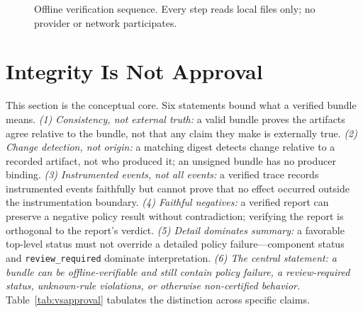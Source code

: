 \documentclass[conference]{IEEEtran}
\newcommand{\code}[1]{\texttt{\small #1}}
\begin{document}
\begin{figure}[t]
\centering
{}
\caption{Offline verification sequence. Every step reads local files only; no provider
or network participates.}
\label{fig:seq}
\end{figure}

\section{Integrity Is Not Approval}\label{sec:integrity}
This section is the conceptual core. Six statements bound what a verified bundle means.
\emph{(1) Consistency, not external truth:} a valid bundle proves the artifacts agree
relative to the bundle, not that any claim they make is externally true. \emph{(2) Change
detection, not origin:} a matching digest detects change relative to a recorded artifact,
not who produced it; an unsigned bundle has no producer binding. \emph{(3) Instrumented
events, not all events:} a verified trace records instrumented events faithfully but
cannot prove that no effect occurred outside the instrumentation boundary.
\emph{(4) Faithful negatives:} a verified report can preserve a negative policy result
without contradiction; verifying the report is orthogonal to the report's verdict.
\emph{(5) Detail dominates summary:} a favorable top-level status must not override a
detailed policy failure---component status and \code{review\_required} dominate
interpretation. \emph{(6) The central statement:} \emph{a bundle can be offline-verifiable
and still contain policy failure, a review-required status, unknown-rule violations, or
otherwise non-certified behavior.} Table~\ref{tab:vsapproval} tabulates the distinction
across specific claims.
\end{document}
